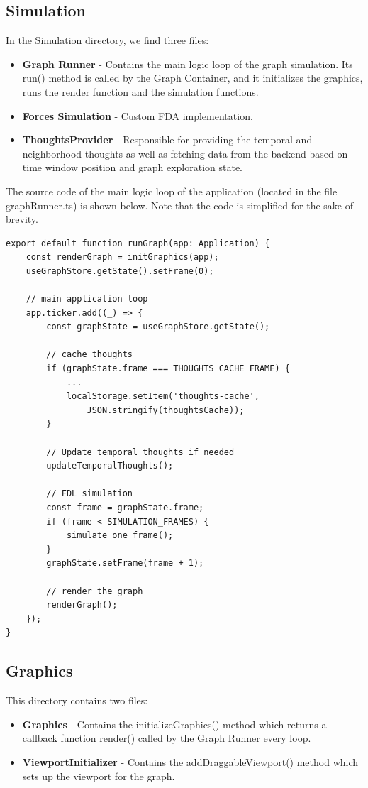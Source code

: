 \subsection*{Simulation}
In the Simulation directory, we find three files:
\begin{itemize}
    \item \textbf{Graph Runner} - Contains the main logic loop of the graph simulation.
 Its run() method is called by the Graph Container, and it initializes the graphics,
 runs the render function and the simulation functions.
    \item \textbf{Forces Simulation} - Custom FDA implementation.
    \item \textbf{ThoughtsProvider} - Responsible for providing the temporal and neighborhood thoughts as well as
 fetching data from the backend based on time window position and graph exploration state.
\end{itemize}

The source code of the main logic loop of the application (located in the file graphRunner.ts) is shown below.
Note that the code is simplified for the sake of brevity.

\begin{lstlisting}
export default function runGraph(app: Application) {
    const renderGraph = initGraphics(app);
    useGraphStore.getState().setFrame(0);

    // main application loop
    app.ticker.add((_) => {
        const graphState = useGraphStore.getState();

        // cache thoughts
        if (graphState.frame === THOUGHTS_CACHE_FRAME) {
            ...
            localStorage.setItem('thoughts-cache',
                JSON.stringify(thoughtsCache));
        }
            
        // Update temporal thoughts if needed
        updateTemporalThoughts();

        // FDL simulation
        const frame = graphState.frame;
        if (frame < SIMULATION_FRAMES) {
            simulate_one_frame();   
        }
        graphState.setFrame(frame + 1);

        // render the graph
        renderGraph();
    });
}
\end{lstlisting}

\subsection*{Graphics}
This directory contains two files:
\begin{itemize}
    \item \textbf{Graphics} - Contains the initializeGraphics() method which returns a callback function render()
 called by the Graph Runner every loop.
    \item \textbf{ViewportInitializer} - Contains the addDraggableViewport() method
 which sets up the viewport for the graph. 
\end{itemize}

